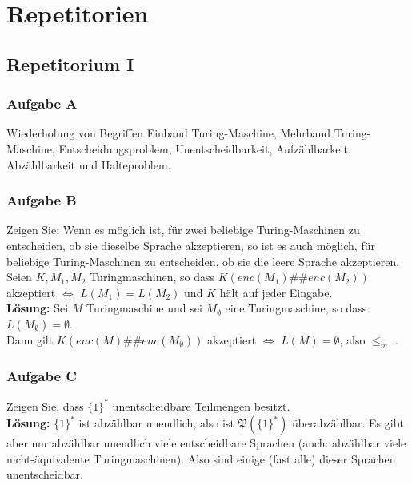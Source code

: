 \section{Repetitorien}

\subsection{Repetitorium I}
\subsubsection*{Aufgabe A}
    Wiederholung von Begriffen Einband Turing-Maschine, Mehrband Turing-Maschine, Entscheidungsproblem, Unentscheidbarkeit, Aufzählbarkeit, Abzählbarkeit und Halteproblem.

\subsubsection*{Aufgabe B}
    Zeigen Sie: Wenn es möglich ist, für zwei beliebige Turing-Maschinen zu entscheiden, ob sie dieselbe Sprache akzeptieren, so ist es auch möglich, für beliebige Turing-Maschinen zu entscheiden, ob sie die leere Sprache akzeptieren. Seien $K, M_1, M_2$ Turingmaschinen, so dass $K(enc(M_1)\#\#enc(M_2))$ akzeptiert $\Leftrightarrow$ $L(M_1) = L(M_2)$ und $K$ hält auf jeder Eingabe. \\
    \textbf{Lösung:} Sei $M$ Turingmaschine und sei $M_\emptyset$ eine Turingmaschine, so dass $L(M_\emptyset) = \emptyset$. \\
    Dann gilt $K(enc(M)\#\#enc(M_\emptyset))$ akzeptiert $\Leftrightarrow$ $L(M) = \emptyset$, also  $\leq_m$ .

\subsubsection*{Aufgabe C}
    Zeigen Sie, dass $\{1\}^*$ unentscheidbare Teilmengen besitzt. \\
    \textbf{Lösung:} $\{1\}^*$ ist abzählbar unendlich, also ist $\mathfrak{P}(\{1\}^*)$ überabzählbar. Es gibt aber nur abzählbar unendlich viele entscheidbare Sprachen (auch: abzählbar viele nicht-äquivalente Turingmaschinen). Also sind einige (fast alle) dieser Sprachen unentscheidbar.

